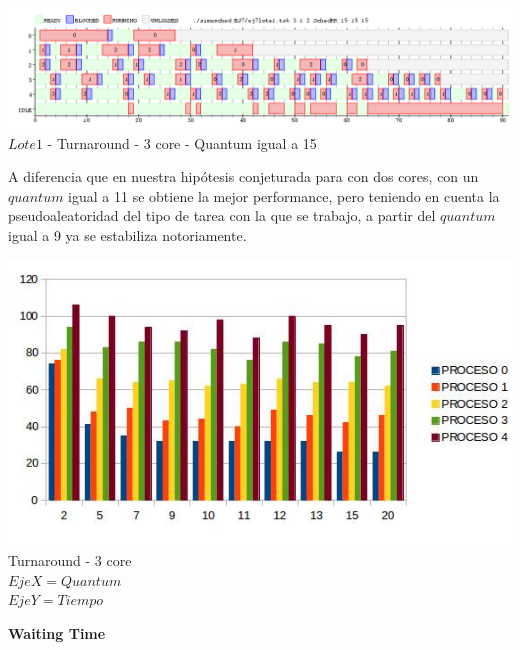  \begin{center}
    	\includegraphics[width=450pt]{./EJ7/ej7tour8core6quan.png}
	{$Lote 1$ - Turnaround - 3 core - Quantum igual a 15}	
 \end{center}
 
 \indent A diferencia que en nuestra hipótesis conjeturada para con dos cores, con un $quantum$ igual a 11 se obtiene la mejor
 performance, pero teniendo en cuenta la pseudoaleatoridad del tipo de tarea con la que se trabajo, a partir del $quantum$ igual
 a 9 ya se estabiliza notoriamente.\\
   
    \begin{center}
    	\includegraphics[width=1\textwidth]{./EJ7/tour3core.png}
	{Turnaround - 3 core}\\
	{$Eje X = Quantum $\\$ Eje Y = Tiempo$}\\
 \end{center} 
  
   \begin{center}
  \textbf{Waiting Time}
 \end{center}

